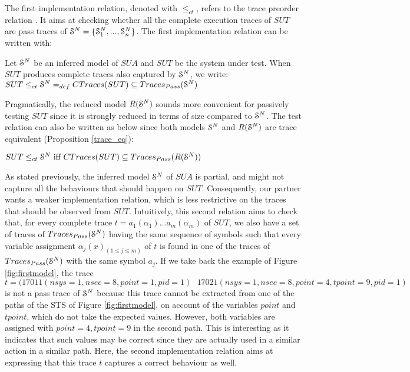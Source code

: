 The first implementation relation, denoted with $\leq_{ct}$, refers to the trace
preorder relation \cite{DNH84}. It aims at checking whether all
the complete execution traces of $\mathit{SUT}$ are pass traces of
$\EuScript{S}^{N}=\{\EuScript{S}_1^{N},...,\EuScript{S}_n^{N}\}$.
The first implementation relation can be written with:

\begin{definition}
	\label{rel:impl1}
    Let $\EuScript{S}^{N}$ be an inferred model of $\mathit{SUA}$ and
    $\mathit{SUT}$ be the system under test. When $\mathit{SUT}$ produces complete
    traces also captured by $\EuScript{S}^{N}$, we write:\\
    ${SUT} \leq_{ct} \EuScript{S}^{N} =_{def} CTraces({SUT}) \subseteq  Traces_{Pass}(\EuScript{S}^{N})$
\end{definition}

Pragmatically, the reduced model $R(\EuScript{S}^{N})$ sounds
more convenient for passively testing $\mathit{SUT}$ since it is strongly
reduced in terms of size compared to $\EuScript{S}^{N}$. The test
relation can also be written as below since both models
$\EuScript{S}^{N}$ and $R(\EuScript{S}^{N})$ are trace equivalent (Proposition \ref{trace_eq}):
\begin{proposition}
	\label{rel:impl12}
    ${SUT} \leq_{ct} \EuScript{S}^{N} \text{ iff } CTraces({SUT}) \subseteq  Traces_{Pass}(R(\EuScript{S}^{N}))$
\end{proposition}

As stated previously, the inferred model $\EuScript{S}^{N}$ of
$\mathit{SUA}$ is partial, and might not capture all the behaviours that
should happen on $\mathit{SUT}$. Consequently, our partner wants a
weaker implementation relation, which is less restrictive on the
traces that should be observed from $\mathit{SUT}$.  Intuitively, this
second relation aims to check that, for every complete trace
$t=a_1(\alpha_1)...a_m(\alpha_m)$ of $\mathit{SUT}$, we also have a set
of traces of $Traces_{Pass}(\EuScript{S}^{N})$ having the same
sequence of symbols such that every variable assignment
$\alpha_j(x)_{(1 \leq j \leq m)}$ of $t$ is found in one of the
traces of $Traces_{Pass}(\EuScript{S}^{N})$ with the same symbol
$a_j$.
If we take back the example of Figure \ref{fig:firstmodel}, the
trace $t=(17011(nsys=1,nsec=8,point=1,pid=1)\text{ }
17021(nsys=1,nsec=8,point=4,tpoint=9,pid=1)$ is not a pass trace
of $\EuScript{S}^{N}$ because this trace cannot be extracted from
one of the paths of the STS of Figure \ref{fig:firstmodel}, on
account of the variables $point$ and $tpoint$, which do not take
the expected values. However, both variables are assigned with
$point=4,tpoint=9$ in the second path. This is interesting as it
indicates that such values may be correct since they are actually
used in a similar action in a similar path. Here, the second
implementation relation aims at expressing that this trace $t$
captures a correct behaviour as well.

